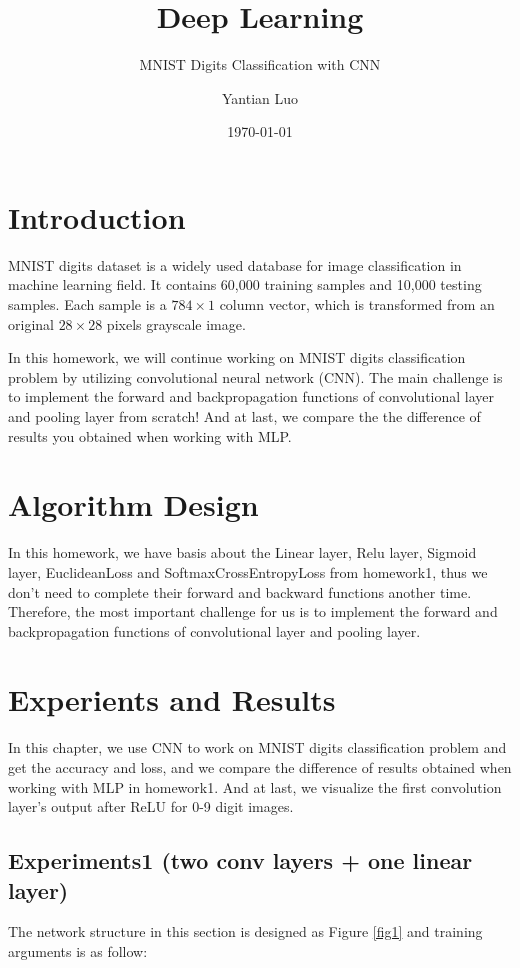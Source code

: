 \documentclass{elegantbook}
\title{Deep Learning}
\subtitle{MNIST Digits Classification with CNN}
\author{Yantian Luo}
\institute{Electronic Engineering}
\date{\today}
\begin{document}
\maketitle
\tableofcontents
\mainmatter
\hypersetup{pageanchor=true}
\chapter{Introduction}
MNIST digits dataset is a widely used database for image classification in machine learning field. It contains 60,000 training samples and 10,000 testing samples. Each sample is a $784\times1$ column vector, which is transformed from an original $28\times28$ pixels grayscale image.

In this homework, we will continue working on MNIST digits classification problem by utilizing convolutional neural network (CNN). The main challenge is to implement the forward and backpropagation functions of convolutional layer and pooling layer from scratch! And at last, we compare the the difference of results you obtained when working with MLP.

\chapter{Algorithm Design}
In this homework, we have basis about the Linear layer, Relu layer, Sigmoid layer, EuclideanLoss and SoftmaxCrossEntropyLoss from homework1, thus we don't need to complete their forward and backward functions another time. Therefore, the most important challenge for us is to implement the forward and backpropagation functions of convolutional layer and
pooling layer.



\chapter{Experients and Results}

In this chapter, we use CNN to work on MNIST digits classification problem and get the accuracy and loss, and we compare the difference of results obtained when working
with MLP in homework1. And at last, we visualize the first convolution layer's output after ReLU for 0-9 digit images.

\section{Experiments1 (two conv layers + one linear layer)}
The network structure in this section is designed as Figure \ref{fig1} and training arguments is as follow:
\end{document}
